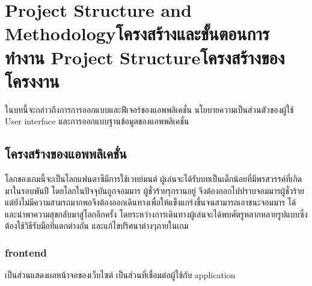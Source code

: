 \chapter{\ifproject%
\ifenglish Project Structure and Methodology\else โครงสร้างและขั้นตอนการทำงาน\fi
\else%
\ifenglish Project Structure\else โครงสร้างของโครงงาน\fi
\fi
}

\enskip \enskip \enskip \enskip \enskip ในบทนี้จะกล่าวถึงการการออกแบบและฟีเจอร์ของแอพพลิเคชั่น นโยบายความเป็นส่วนตัวของผู้ใช้ User interface และการออกแบบฐานข้อมูลของแอพพลิเคชั่น



\makeatletter


\makeatother

\section{โครงสร้างของแอพพลิเคชั่น}
\enskip \enskip \enskip \enskip \enskip โลกของเกมนี้จะเป็นโลกแฟนตาซีมีการใช้เวทย์มนต์ ผู้เล่นจะได้รับบทเป็นเด็กน้อยที่มีพรสวรรค์ที่เกิดมาในรอบพันปี โดยโลกในปัจจุบันถูกจอมมาร
ผู้ชั่วร้ายรุกรานอยู่ จึงต้องออกไปปราบจอมมารผู้ชั่วร้าย แต่ยังไม่มีความสามรถมากพอจึงต้องออกเดินทางเพื่อให้แข็งแกร่งขึ้นจนสามารถเอาชนะจอมมาร
ได้และนำพาความสุขกลับมาสู่โลกอีกครั้ง โดยระหว่างการเดินทางผู้เล่นจะได้พบศัตรูหลากหลายรูปแบบซึ่งต้องใช้วิธีรับมือที่แตกต่างกัน 
และแก้ไขปริศนาต่างๆภายในเกม
\subsection{frontend}
\enskip \enskip \enskip \enskip \enskip 
เป็นส่วนแสดงผลหน้าจอของเว็บไซต์ เป็นส่วนที่เชื่อมต่อผู้ใช้กับ application

